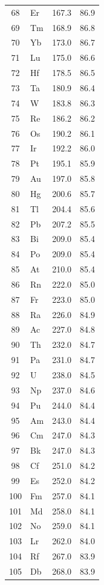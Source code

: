 \documentclass[11pt,a4paper]{article}
\begin{document}
\begin{longtable}{c l c c}
		68 & Er  & 167.3  & 86.9 \\
		69 & Tm  & 168.9  & 86.8 \\
		70 & Yb  & 173.0  & 86.7 \\
		71 & Lu  & 175.0  & 86.6 \\
		72 & Hf  & 178.5  & 86.5 \\
		73 & Ta  & 180.9  & 86.4 \\
		74 & W   & 183.8  & 86.3 \\
		75 & Re  & 186.2  & 86.2 \\
		76 & Os  & 190.2  & 86.1 \\
		77 & Ir  & 192.2  & 86.0 \\
		78 & Pt  & 195.1  & 85.9 \\
		79 & Au  & 197.0  & 85.8 \\
		80 & Hg  & 200.6  & 85.7 \\
		81 & Tl  & 204.4  & 85.6 \\
		82 & Pb  & 207.2  & 85.5 \\
		83 & Bi  & 209.0  & 85.4 \\
		84 & Po  & 209.0  & 85.4 \\
		85 & At  & 210.0  & 85.4 \\
		86 & Rn  & 222.0  & 85.0 \\
		87 & Fr  & 223.0  & 85.0 \\
		88 & Ra  & 226.0  & 84.9 \\
		89 & Ac  & 227.0  & 84.8 \\
		90 & Th  & 232.0  & 84.7 \\
		91 & Pa  & 231.0  & 84.7 \\
		92 & U   & 238.0  & 84.5 \\
		93 & Np  & 237.0  & 84.6 \\
		94 & Pu  & 244.0  & 84.4 \\
		95 & Am  & 243.0  & 84.4 \\
		96 & Cm  & 247.0  & 84.3 \\
		97 & Bk  & 247.0  & 84.3 \\
		98 & Cf  & 251.0  & 84.2 \\
		99 & Es  & 252.0  & 84.2 \\
		100& Fm  & 257.0  & 84.1 \\
		101& Md  & 258.0  & 84.1 \\
		102& No  & 259.0  & 84.1 \\
		103& Lr  & 262.0  & 84.0 \\
		104& Rf  & 267.0  & 83.9 \\
		105& Db  & 268.0  & 83.9 \\

\end{longtable}
\end{document}
